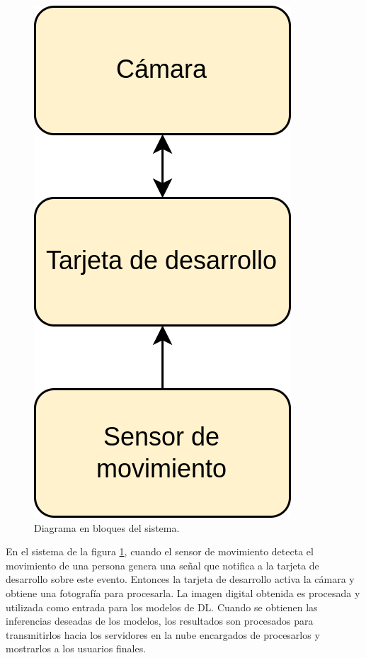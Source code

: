 \begin{figure}[h]
	\centering
	\includegraphics[scale=0.25]{./Figures/sys_blocks.png}
	\caption{Diagrama en bloques del sistema.}
	\label{fig:sys_blocks}
\end{figure}

En el sistema de la figura \ref{fig:sys_blocks}, cuando el sensor de movimiento detecta el movimiento de una persona genera una señal que notifica a la tarjeta de desarrollo sobre este evento. Entonces la tarjeta de desarrollo activa la cámara y obtiene una fotografía para procesarla. La imagen digital obtenida es procesada y utilizada como entrada para los modelos de DL. Cuando se obtienen las inferencias deseadas de los modelos, los resultados son procesados para transmitirlos hacia los servidores en la nube encargados de procesarlos y mostrarlos a los usuarios finales.

